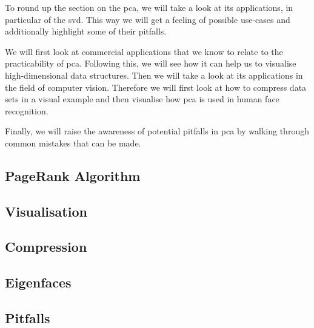 To round up the section on the \acrlong{pca}, we will take a look at its applications, in particular of the \acrlong{svd}.
This way we will get a feeling of possible use-cases and additionally highlight some of their pitfalls.

We will first look at commercial applications that we know to relate to the practicability of \gls{pca}.
Following this, we will see how it can help us to visualise high-dimensional data structures.
Then we will take a look at its applications in the field of computer vision.
Therefore we will first look at how to compress data sets in a visual example and then visualise how \gls{pca} is used in human face recognition.

Finally, we will raise the awareness of potential pitfalls in \gls{pca} by walking through common mistakes that can be made.


\subsection{PageRank Algorithm}

\clearpage

\subsection{Visualisation}

\clearpage

\subsection{Compression}

\clearpage

\subsection{Eigenfaces} \label{sec:eigenfaces}

\clearpage

\subsection{Pitfalls}

\clearpage
